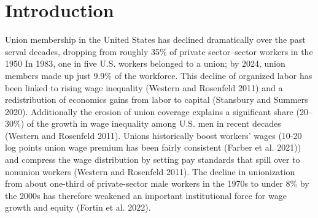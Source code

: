 






\section{Introduction}


Union membership in the United States has declined dramatically over the past serval decades, dropping from roughly 35\% of private sector--sector workers in the 1950
In 1983, one in five U.S. workers belonged to a union; by 2024, union members made up just 9.9\% of the workforce.  
This decline of organized labor has been linked to rising wage inequality (Western and Rosenfeld 2011) and a redistribution of economics gains from labor to capital (Stansbury and Summers 2020).
Additionally the erosion of union coverage explains a significant share (20--30\%) of the growth in wage inequality among U.S. men in recent decades (Western and Rosenfeld 2011).
Unions historically boost workers' wages (10-20 log points union wage premium has been fairly consistent (Farber et al. 2021)) and compress the wage distribution by setting pay standards that spill over to nonunion workers (Western and Rosenfeld 2011).
The decline in unionization from about one-third of private-sector male workers in the 1970s to under 8\% by the 2000s has therefore weakened an important institutional force for wage growth and equity (Fortin et al. 2022).


